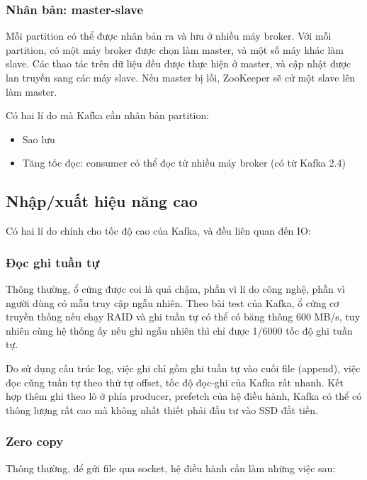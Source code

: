 \documentclass{article}
\begin{document}
\subsubsection{Nhân bản: master-slave}

Mỗi partition có thể được nhân bản ra và lưu ở nhiều máy broker. Với mỗi
partition, có một máy broker được chọn làm master, và một số máy khác làm slave.
Các thao tác trên dữ liệu đều được thực hiện ở master, và cập nhật được lan
truyền sang các máy slave. Nếu master bị lỗi, ZooKeeper sẽ cử một slave lên làm
master.

Có hai lí do mà Kafka cần nhân bản partition:

\begin{itemize}
    \item Sao lưu
    \item Tăng tốc đọc: consumer có thể đọc từ nhiều máy broker (có từ Kafka
    2.4)
\end{itemize}

\subsection{Nhập/xuất hiệu năng cao}

Có hai lí do chính cho tốc độ cao của Kafka, và đều liên quan đến IO:

\subsubsection{Đọc ghi tuần tự}

Thông thường, ổ cứng được coi là quá chậm, phần vì lí do công nghệ, phần vì
người dùng có mẫu truy cập ngẫu nhiên. Theo bài test của Kafka, ổ cứng cơ truyền
thống nếu chạy RAID và ghi tuần tự có thể có băng thông 600 MB/s, tuy nhiên cùng
hệ thống ấy nếu ghi ngẫu nhiên thì chỉ được 1/6000 tốc độ ghi tuần tự.

Do sử dụng cấu trúc log, việc ghi chỉ gồm ghi tuần tự vào cuối file (append),
việc đọc cũng tuần tự theo thứ tự offset, tốc độ đọc-ghi của Kafka rất nhanh.
Kết hợp thêm ghi theo lô ở phía producer, prefetch của hệ điều hành, Kafka có
thể có thông lượng rất cao mà không nhất thiết phải đầu tư vào SSD đắt tiền.

\subsubsection{Zero copy}

Thông thường, để gửi file qua socket, hệ điều hành cần làm những việc sau:
\end{document}
